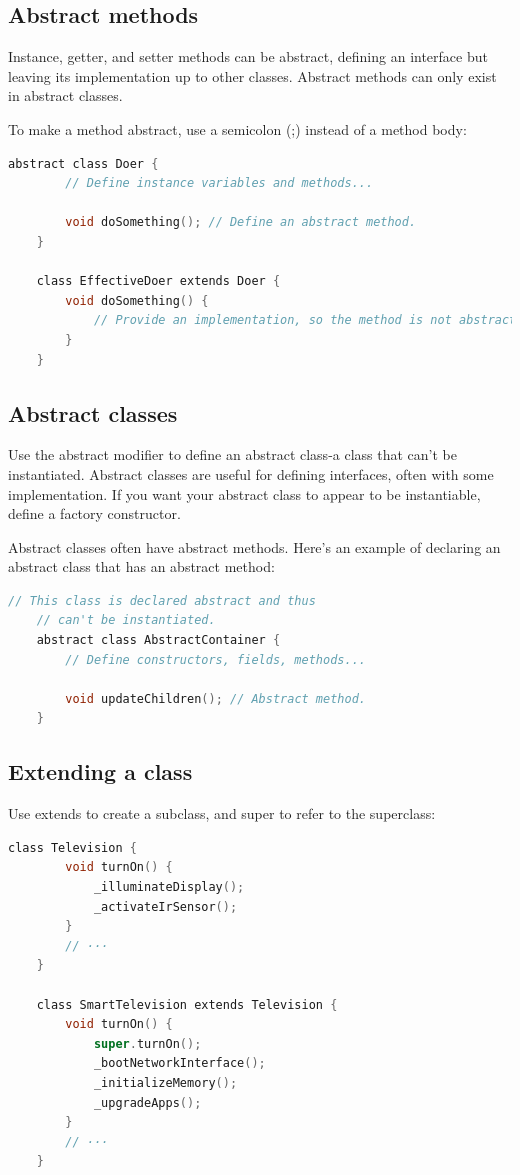 \subsection{Abstract methods}
Instance, getter, and setter methods can be abstract, defining an interface but leaving its implementation up to other classes. Abstract methods can only exist in abstract classes.

To make a method abstract, use a semicolon (;) instead of a method body:

\begin{lstlisting}[language=C]
	abstract class Doer {
		// Define instance variables and methods...
		
		void doSomething(); // Define an abstract method.
	}
	
	class EffectiveDoer extends Doer {
		void doSomething() {
			// Provide an implementation, so the method is not abstract here...
		}
	}
\end{lstlisting}
\subsection{Abstract classes}
Use the abstract modifier to define an abstract class-a class that can't be instantiated. Abstract classes are useful for defining interfaces, often with some implementation. If you want your abstract class to appear to be instantiable, define a factory constructor.

Abstract classes often have abstract methods. Here's an example of declaring an abstract class that has an abstract method:
\begin{lstlisting}[language=C]
	// This class is declared abstract and thus
	// can't be instantiated.
	abstract class AbstractContainer {
		// Define constructors, fields, methods...
		
		void updateChildren(); // Abstract method.
	}
\end{lstlisting}
\subsection{Extending a class}
Use extends to create a subclass, and super to refer to the superclass:
\begin{lstlisting}[language=C]
	class Television {
		void turnOn() {
			_illuminateDisplay();
			_activateIrSensor();
		}
		// ···
	}
	
	class SmartTelevision extends Television {
		void turnOn() {
			super.turnOn();
			_bootNetworkInterface();
			_initializeMemory();
			_upgradeApps();
		}
		// ···
	}
	
\end{lstlisting}
